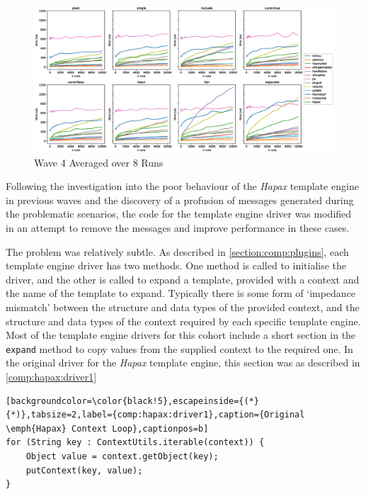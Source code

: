 \begin{figure}[ht!]
\centering
\includegraphics[width=\columnwidth]{Figures/graphs/wave4/2023-12-19-avg.eps}
\caption{\label{multi:wave4-average}Wave 4 Averaged over 8 Runs}
\end{figure}

Following the investigation into the poor behaviour of the \emph{Hapax} template engine in previous waves and the discovery of a profusion of messages generated during the problematic scenarios, the code for the template engine driver was modified in an attempt to remove the messages and improve performance in these cases.

The problem was relatively subtle. As described in \autoref{section:comp:plugins}, each template engine driver has two methods. One method is called to initialise the driver, and the other is called to expand a template, provided with a context and the name of the template to expand. Typically there is some form of `impedance mismatch' between the structure and data types of the provided context, and the structure and data types of the context required by each specific template engine. Most of the template engine drivers for this cohort include a short section in the \verb!expand! method to copy values from the supplied context to the required one. In the original driver for the \emph{Hapax} template engine, this section was as described in \autoref{comp:hapax:driver1}

\begin{lstlisting}[backgroundcolor=\color{black!5},escapeinside={(*}{*)},tabsize=2,label={comp:hapax:driver1},caption={Original \emph{Hapax} Context Loop},captionpos=b]
for (String key : ContextUtils.iterable(context)) {
    Object value = context.getObject(key);
    putContext(key, value);
}
\end{lstlisting}

